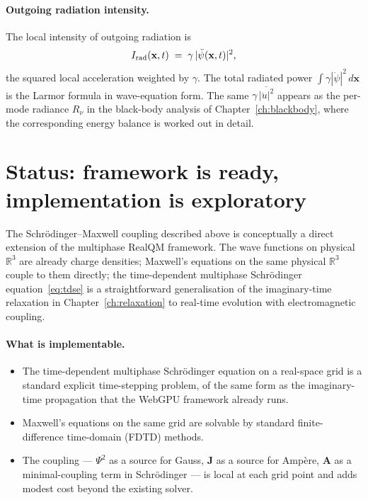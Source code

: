 \paragraph{Outgoing radiation intensity.}
The local intensity of outgoing radiation is
\[
I_{\rm rad}(\mathbf{x}, t) \;=\; \gamma\, |\ddot\psi(\mathbf{x}, t)|^2,
\]
the squared local acceleration weighted by $\gamma$. The total radiated power $\int \gamma |\ddot\psi|^2\, d\mathbf{x}$ is the Larmor formula in wave-equation form. The same $\gamma\, \overline{|\ddot u|^2}$ appears as the per-mode radiance $R_\nu$ in the black-body analysis of Chapter~\ref{ch:blackbody}, where the corresponding energy balance is worked out in detail.

\section{Status: framework is ready, implementation is exploratory}\label{sec:sm-status}

The Schr\"odinger--Maxwell coupling described above is conceptually a direct extension of the multiphase RealQM framework. The wave functions on physical $\mathbb{R}^3$ are already charge densities; Maxwell's equations on the same physical $\mathbb{R}^3$ couple to them directly; the time-dependent multiphase Schr\"odinger equation~\eqref{eq:tdse} is a straightforward generalisation of the imaginary-time relaxation in Chapter~\ref{ch:relaxation} to real-time evolution with electromagnetic coupling.

\paragraph{What is implementable.}
\begin{itemize}
\item The time-dependent multiphase Schr\"odinger equation on a real-space grid is a standard explicit time-stepping problem, of the same form as the imaginary-time propagation that the WebGPU framework already runs.
\item Maxwell's equations on the same grid are solvable by standard finite-difference time-domain (FDTD) methods.
\item The coupling --- $\Psi^2$ as a source for Gauss, $\mathbf{J}$ as a source for Amp\`ere, $\mathbf{A}$ as a minimal-coupling term in Schr\"odinger --- is local at each grid point and adds modest cost beyond the existing solver.
\end{itemize}


